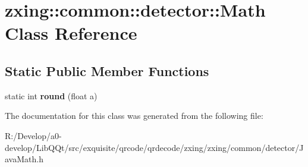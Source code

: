 \hypertarget{classzxing_1_1common_1_1detector_1_1_math}{}\section{zxing\+:\+:common\+:\+:detector\+:\+:Math Class Reference}
\label{classzxing_1_1common_1_1detector_1_1_math}
\subsection*{Static Public Member Functions}
\begin{DoxyCompactItemize}
\item 
\mbox{\label{classzxing_1_1common_1_1detector_1_1_math_aaee4de7e1ef230d1649a7384da66f878}} 
static int {\bfseries round} (float a)
\end{DoxyCompactItemize}


The documentation for this class was generated from the following file\+:\begin{DoxyCompactItemize}
\item 
R\+:/\+Develop/a0-\/develop/\+Lib\+Q\+Qt/src/exquisite/qrcode/qrdecode/zxing/zxing/common/detector/Java\+Math.\+h\end{DoxyCompactItemize}
